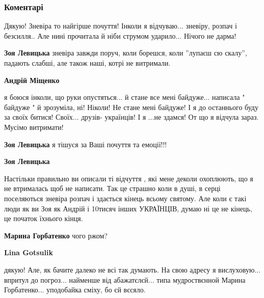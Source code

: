  
 
 
 
 
\subsubsection{Коментарі}
\label{sec:29_12_2019.fb.mischenko_andrej.1.peretvorennja_na_naciu.cmt}

\begin{itemize} %

Дякую! Зневіра то найгірше почуття! Інколи я відчуваю... зневіру, розпач і
безсилля.. Але нині прочитала й ніби струмом ударило... Нічого не дарма!

\begin{itemize} %
\textbf{Зоя Левицька} зневіра завжди поруч, коли борешся, коли ''лупаєш сю скалу'', падають слабші, але також наші, котрі не витримали.

\textbf{Андрій Міщенко} 

я боюся інколи, що руки опустяться... й стане все мені байдуже... написала "
байдуже " й зрозуміла, ні! Ніколи! Не стане мені байдуже! І я до останнього
буду за своїх битися! Своїх... друзів- українців! І я ...не здамся! От що я
відчула зараз. Мусімо витримати!


\textbf{Зоя Левицька} я тішуся за Ваші почуття та емоції!!!

\textbf{Зоя Левицька}

Настільки правильно ви описали ті відчуття , які мене деколи охоплюють, що я не
втрималась щоб не написати. Так це страшно коли в душі, в серці поселяються
зневіра розпач і здається кінець всьому святому. Але коли є такі люди як ви Зоя
як Андрій і 10тисяч інших УКРАЇНЦІВ, думаю ні це не кінець, це початок їхнього
кінця.

\textbf{Марина Горбатенко} чого ржом?

\textbf{Lina Gotsulik} 

дякую! Але, як бачите далеко не всі так думають. На свою адресу я
вислуховую... впритул до погроз... найменше від абажатєлєй... типа мудроствєнной
Марина Горбатенко... уподобайка сміху, бо єй вєсяло.


\end{itemize}
\end{itemize}
